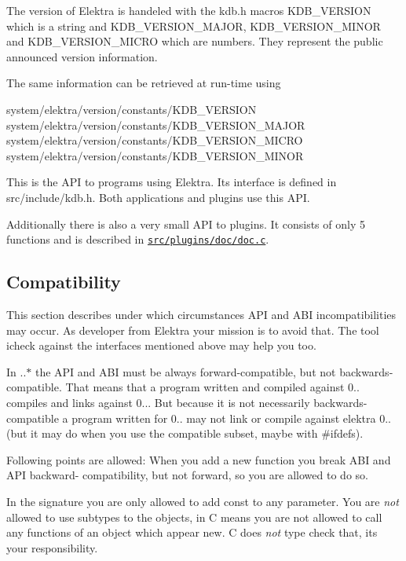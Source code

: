 The version of Elektra is handeled with the kdb.\+h macros {\ttfamily K\+D\+B\+\_\+\+V\+E\+R\+S\+I\+ON} which is a string and {\ttfamily K\+D\+B\+\_\+\+V\+E\+R\+S\+I\+O\+N\+\_\+\+M\+A\+J\+OR}, {\ttfamily K\+D\+B\+\_\+\+V\+E\+R\+S\+I\+O\+N\+\_\+\+M\+I\+N\+OR} and {\ttfamily K\+D\+B\+\_\+\+V\+E\+R\+S\+I\+O\+N\+\_\+\+M\+I\+C\+RO} which are numbers. They represent the public announced version information.

The same information can be retrieved at run-\/time using \begin{DoxyVerb}system/elektra/version/constants/KDB_VERSION
system/elektra/version/constants/KDB_VERSION_MAJOR
system/elektra/version/constants/KDB_VERSION_MICRO
system/elektra/version/constants/KDB_VERSION_MINOR
\end{DoxyVerb}


This is the A\+PI to programs using Elektra. Its interface is defined in src/include/kdb.h. Both applications and plugins use this A\+PI.

Additionally there is also a very small A\+PI to plugins. It consists of only 5 functions and is described in \href{/home/markus/Projekte/Elektra/current/src/plugins/doc/doc.c}{\tt src/plugins/doc/doc.\+c}.

\subsection*{Compatibility}

This section describes under which circumstances A\+PI and A\+BI incompatibilities may occur. As developer from Elektra your mission is to avoid that. The tool icheck against the interfaces mentioned above may help you too.

In {..$\ast$} the A\+PI and A\+BI must be always forward-\/compatible, but not backwards-\/compatible. That means that a program written and compiled against 0.. compiles and links against 0... But because it is not necessarily backwards-\/compatible a program written for 0.. may not link or compile against elektra 0.. (but it may do when you use the compatible subset, maybe with \#ifdefs).

Following points are allowed\+: When you add a new function you break A\+BI and A\+PI backward-\/ compatibility, but not forward, so you are allowed to do so.

In the signature you are only allowed to add const to any parameter. You are {\itshape not} allowed to use subtypes to the objects, in C means you are not allowed to call any functions of an object which appear new. C does {\itshape not} type check that, it\textquotesingle{}s your responsibility.

